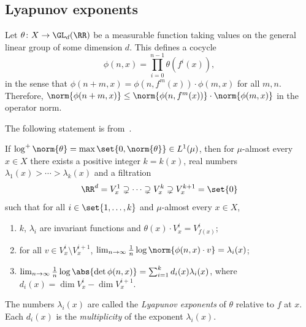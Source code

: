 \documentclass[../main]{subfiles}
\begin{document}

\subsection{Lyapunov exponents}\label{sec:lyapunov-exponents}

Let \(\theta \colon X \to \GL_d(\RR)\) be a measurable function taking values on the general linear group of some dimension \(d\). This defines a cocycle
\begin{equation*}
  \phi(n,x) = \prod_{i = 0}^{n - 1} \theta(f^i(x)),
\end{equation*}
in the sense that \(\phi(n + m,x) = \phi(n,f^m(x)) \cdot \phi(m,x)\) for all \(m,n\). Therefore, \(\norm{\phi(n + m,x)}\le \norm{\phi(n,f^m(x))} \cdot \norm{\phi(m,x)}\) in the operator norm.

The following statement is from~\cite{vianaFoundationsErgodicTheory2016}.

\begin{theorem}[Oseledets]\label{thm:oseledets}
  If \(\log^+ \norm{\theta} = \max \set{0, \norm{\theta}} \in L^1(\mu)\), then for \(\mu\)-almost every \(x \in X\) there exists a positive integer \(k = k(x)\), real numbers \(\lambda_1(x) > \cdots > \lambda_k(x)\) and a filtration
  \begin{equation*}
    \RR^d = V_x^1 \supsetneq \cdots \supsetneq V^k_x \supsetneq V^{k + 1}_x = \set{0}
  \end{equation*}
  such that for all \(i \in \set{1,\dots,k}\) and \(\mu\)-almost every \(x \in X\),
  \begin{enumerate}
  \item \(k\), \(\lambda_i\) are invariant functions and \(\theta(x) \cdot V_x^i = V^i_{f(x)}\);
  \item\label{item:7} for all \(v \in V^i_x \setminus V^{i + 1}_x\), \(\lim_{n \to \infty} \frac{1}{n}\log \norm{\phi(n,x) \cdot v} = \lambda_i(x)\);
  \item\label{item:8} \(\lim_{n \to \infty} \frac{1}{n}\log \abs{\det{\phi(n,x)}} = \sum_{i = 1}^k d_i(x) \lambda_i(x)\), where \(d_i(x) = \dim V^i_x - \dim V^{i + 1}_x\).
  \end{enumerate}
\end{theorem}
The numbers \(\lambda_i(x)\) are called the \emph{Lyapunov exponents} of \(\theta\) relative to \(f\) at \(x\). Each \(d_i(x)\) is the \emph{multiplicity} of the exponent \(\lambda_i(x)\).
\end{document}
